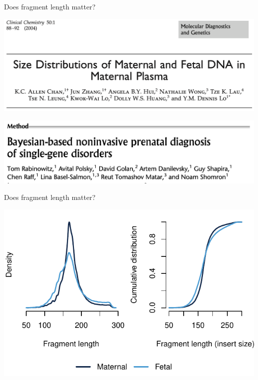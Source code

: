 \documentclass[
  10pt,
  ignorenonframetext,
  m]{beamer}
\begin{document}
\begin{frame}{Does fragment length matter?}
\protect\hypertarget{does-fragment-length-matter}{}

\centering \includegraphics{images/chan.png}

\bigskip

\centering \includegraphics{images/rabinowitz.png}

\end{frame}

\begin{frame}{Does fragment length matter?}
\protect\hypertarget{does-fragment-length-matter-1}{}

\begin{center}\includegraphics{defense_files/figure-beamer/matVsFetLen-1} \end{center}

\end{frame}
\end{document}
